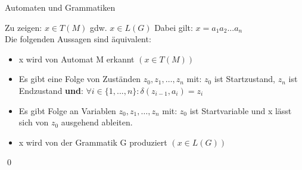 \begin{frame}[fragile]{Automaten und Grammatiken}
    \begin{alertblock}{Zu zeigen: $x \in T(M)$ gdw. $x \in L(G)$}
    Dabei gilt: $x=a_1 a_2 ... a_n$\\
    Die folgenden Aussagen sind äquivalent:
        \begin{itemize}
            \item x wird von Automat M erkannt \emph{$(x\in T(M))$}
            \item Es gibt eine Folge von Zuständen $z_0, z_1, \dots, z_n$ mit: $z_0$ ist Startzustand, $z_n$ ist Endzustand \textbf{und}: $\forall i \in \{1, ..., n\}: \delta(z_{i-1}, a_i)=z_i$
            \item Es gibt Folge an Variablen $z_0, z_1, \dots, z_n$ mit: $z_0$ ist Startvariable und x lässt sich von $z_0$ ausgehend ableiten.
            \item x wird von der Grammatik G produziert \emph{$(x \in L(G))$}
        \end{itemize}
        \qed
    \end{alertblock}
\end{frame}



        
